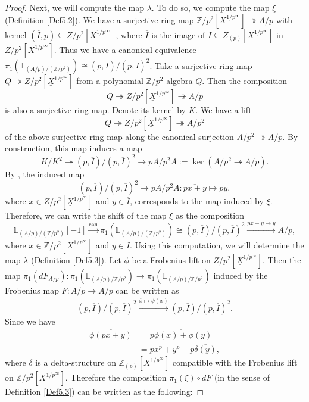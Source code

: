 \documentclass[11pt, a4paper]{amsart}
\theoremstyle{plain}
\theoremstyle{definition}
\begin{document}
\begin{proof}
Next, we will compute the map $\lambda$. To do so, we compute the map $\xi$ (Definition \ref{Def5.2}). We have a surjective ring map $\mathbb Z/p^2[\underline{X}^{1/p^{\infty}}]\twoheadrightarrow A/p$ with kernel $(\overline I,p)\subseteq Z/p^2[\underline{X}^{1/p^{\infty}}]$, where $\overline I$ is the image of $I\subseteq Z_{(p)}[\underline{X}^{1/p^{\infty}}]$ in $Z/p^2[\underline{X}^{1/p^{\infty}}]$. Thus we have a canonical equivalence $\pi_1(\mathbb L_{(A/p)/(\mathbb Z/p^2)})\cong (p,\overline I)/(p,\overline I)^2$. Take a surjective ring map $Q\twoheadrightarrow Z/p^2[\underline{X}^{1/p^{\infty}}]$ from a polynomial $\mathbb Z/p^2$-algebra $Q$. Then the composition \[Q\twoheadrightarrow Z/p^2[\underline{X}^{1/p^{\infty}}]\twoheadrightarrow A/p\] is also a surjective ring map. Denote its kernel by $K$. We have a lift \[Q\twoheadrightarrow Z/p^2[\underline{X}^{1/p^{\infty}}]\twoheadrightarrow A/p^2\] of the above surjective ring map along the canonical surjection $A/p^2\twoheadrightarrow A/p$. By construction, this map induces a map \[K/K^2\twoheadrightarrow (p,\overline I)/(p,\overline I)^2\to pA/p^2A:=\operatorname{ker}(A/p^2\twoheadrightarrow A/p).\] By \cite[Tag 0GPU]{Sta26}, the induced map \[(p,\overline I)/(p,\overline I)^2\to pA/p^2A:\overline{px+y}\mapsto p\overline y,\] where $x\in Z/p^2[\underline{X}^{1/p^{\infty}}]$ and $y\in \overline I$, corresponds to the map induced by $\xi$. Therefore, we can write the shift of the map $\xi$ as the composition\[\mathbb L_{(A/p)/(\mathbb Z/p^2)}[-1]\xrightarrow[]{\mathrm{can}}\pi_1(\mathbb L_{(A/p)/(\mathbb Z/p^2)})\cong (p,\overline I)/(p,\overline I)^2\xrightarrow[]{px+y\mapsto y}A/p,\] where $x\in \mathbb Z/p^2[\underline{X}^{1/p^{\infty}}]$ and $y\in \overline I$. Using this computation, we will determine the map $\lambda$ (Definition \ref{Def5.3}). Let $\phi$ be a Frobenius lift on $Z/p^2[\underline{X}^{1/p^{\infty}}]$. Then the map $\pi_1(dF_{A/p}):\pi_1(\mathbb L_{(A/p)/\mathbb Z/p^2})\to \pi_1(\mathbb L_{(A/p)/\mathbb Z/p^2})$ induced by the Frobenius map $F:A/p\to A/p$ can be written as \[(p,\overline I)/(p,\overline I)^2\xrightarrow[]{\overline x\mapsto \overline{\phi(x)}}(p,\overline I)/(p,\overline I)^2.\]
Since we have \begin{align*}
    \overline {\phi(px+y)}&=\overline{p\phi(x)+\phi(y)}\\&=p\overline{x^p}+\overline{y^p}+p\overline {\delta(y)},
\end{align*} where $\delta$ is a delta-structure on $\mathbb Z_{(p)}[\underline{X}^{1/p^{\infty}}]$ compatible with the Frobenius lift on $\mathbb Z/p^2[\underline{X}^{1/p^{\infty}}]$. Therefore the composition $\pi_1(\xi)\circ dF$ (in the sense of Definition \ref{Def5.3}) can be written as the following:

\end{proof}
\end{document}
